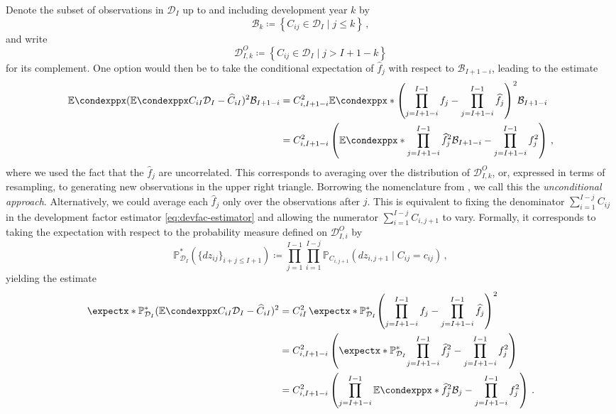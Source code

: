 \documentclass[a4paper]{book}
\begin{document}
Denote the subset of observations in $\mathcal{D}_I$ up to and including development year $k$ by
\begin{equation}
  \mathcal{B}_k \coloneqq \left \{ C_{ij} \in \mathcal{D}_I \mid j \leq k \right \} \,,
\end{equation}
and write
\begin{equation}
  \mathcal{D}^O_{I, k} \coloneqq \left \{ C_{ij} \in \mathcal{D}_I \mid j > I + 1 - k \right \}
\end{equation}
for its complement. One option would then be to take the conditional expectation of $\widehat{f}_j$ with respect to $\mathcal{B}_{I+1-i}$, leading to the estimate
\begin{align} \label{eq:uncond-param-err}
  \condexpp{(\condexpp{C_{iI}}{\mathcal{D}_I} - \widehat{C}_{iI})^2}{\mathcal{B}_{I+1-i}} & = C^2_{i, I+1-i} \condexpp*{\left( \prod_{j=I+1-i}^{I-1}f_j - \prod_{j=I+1-i}^{I-1}\widehat{f}_j \right)^2}{\mathcal{B}_{I+1-i}}      \\
                                                                                          & = C^2_{i, I+1-i} \left( \condexpp*{\prod_{j=I+1-i}^{I-1}\widehat{f}^2_j}{\mathcal{B}_{I+1-i}} - \prod_{j=I+1-i}^{I-1}f^2_j \right)\,,
\end{align}
where we used the fact that the $\widehat{f}_j$ are uncorrelated. This corresponds to averaging over the distribution of $\mathcal{D}^O_{I, k}$, or, expressed in terms of resampling, to generating new observations in the upper right triangle. Borrowing the nomenclature from \cite{wuthrich:chain-ladder-msep}, we call this the \emph{unconditional approach}. Alternatively, we could average each $\widehat{f}_j$ only over the observations after $j$. This is equivalent to fixing the denominator $\sum_{i = 1}^{I - j} C_{ij}$ in the development factor estimator \cref{eq:devfac-estimator} and allowing the numerator $\sum_{i = 1}^{I - j} C_{i, j + 1}$ to vary. Formally, it corresponds to taking the expectation with respect to the probability measure defined on $\mathcal{D}^O_{I, i}$ by
\begin{equation}
  \mathbb{P}^*_{\mathcal{D}_I}(\{ dz_{ij} \}_{i + j \leq I + 1}) \coloneqq \prod_{j = 1}^{I - 1} \prod_{i = 1}^{I - j}  \mathbb{P}_{C_{i, j + 1}}(dz_{i, j + 1} \mid C_{ij} = c_{ij}) \,,
\end{equation}
yielding the estimate
\begin{align}
  \expect[\mathbb{P}^*_{\mathcal{D}_I}]{(\condexpp{C_{iI}}{\mathcal{D}_I} - \widehat{C}_{iI})^2} & = C^2_{iI} \, \expect[\mathbb{P}^*_{\mathcal{D}_I}]{\left( \prod_{j=I+1-i}^{I-1}f_j - \prod_{j=I+1-i}^{I-1}\widehat{f}_j \right)^2}      \\
                                                                                                 & = C^2_{i, I+1-i} \left( \expect[\mathbb{P}^*_{\mathcal{D}_I}]{\prod_{j=I+1-i}^{I-1}\widehat{f}^2_j} - \prod_{j=I+1-i}^{I-1}f^2_j \right) \\
                                                                                                 & = C^2_{i, I+1-i} \left( \prod_{j=I+1-i}^{I-1} \condexpp*{\widehat{f}^2_j}{\mathcal{B}_j} - \prod_{j=I+1-i}^{I-1}f^2_j \right) \,.
\end{align}
\end{document}

